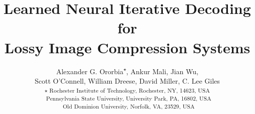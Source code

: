 \documentclass[smallabstract,smallcaptions]{dccpaper}
\begin{document}
\title{\bf Learned Neural Iterative Decoding for \\Lossy Image Compression Systems}
\author{Alexander G. Ororbia\textsuperscript{$\star$}, 
Ankur Mali\textsuperscript{\textdagger}, 
Jian Wu\textsuperscript{\textdaggerdbl},\\  
Scott O'Connell\textsuperscript{\textdagger}, 
William Dreese\textsuperscript{\textdagger}, 
David Miller\textsuperscript{\textdagger}, 
C. Lee Giles\textsuperscript{\textdagger}\\ [0.5em] 
\textsuperscript{$\star$ Rochester Institute of Technology, Rochester, NY, 14623, USA}\\
\textsuperscript{\textdagger\ Pennsylvania State University, University Park, PA, 16802, USA}\\
\textsuperscript{\textdaggerdbl\ Old Dominion University, Norfolk, VA, 23529, USA}
}
\maketitle
\thispagestyle{empty}
\setcounter{page}{1}
\end{document}
